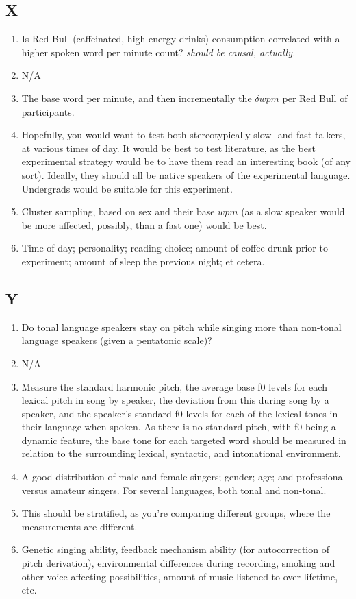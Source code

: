 \documentclass[11pt]{article}
\begin{document}
\subsection{X}
\begin{enumerate}
\item Is Red Bull (caffeinated, high-energy drinks) consumption correlated with a higher spoken word per minute count? {\it should be causal, actually.}
\item N/A
\item The base word per minute, and then incrementally the $\delta wpm$ per Red Bull of participants. 
\item Hopefully, you would want to test both stereotypically slow- and fast-talkers, at various times of day. It would be best to test literature, as the best experimental strategy would be to have them read an interesting book (of any sort). Ideally, they should all be native speakers of the experimental language. Undergrads would be suitable for this experiment. 
\item Cluster sampling, based on sex and their base $wpm$ (as a slow speaker would be more affected, possibly, than a fast one) would be best. 
\item Time of day; personality; reading choice; amount of coffee drunk prior to experiment; amount of sleep the previous night; et cetera. 
\end{enumerate}
\subsection{Y}
\begin{enumerate}
\item Do tonal language speakers stay on pitch while singing more than non-tonal language speakers (given a pentatonic scale)?
\item N/A
\item Measure the standard harmonic pitch, the average base f0 levels for each lexical pitch in song by speaker, the deviation from this during song by a speaker, and the speaker's standard f0 levels for each of the lexical tones in their language when spoken. As there is no standard pitch, with f0 being a dynamic feature, the base tone for each targeted word should be measured in relation to the surrounding lexical, syntactic, and intonational environment.  
\item A good distribution of male and female singers; gender; age; and professional versus amateur singers. For several languages, both tonal and non-tonal. 
\item This should be stratified, as you're comparing different groups, where the measurements are different. 
\item Genetic singing ability, feedback mechanism ability (for autocorrection of pitch derivation), environmental differences during recording, smoking and other voice-affecting possibilities, amount of music listened to over lifetime, etc. 
\end{enumerate}
\end{document}
